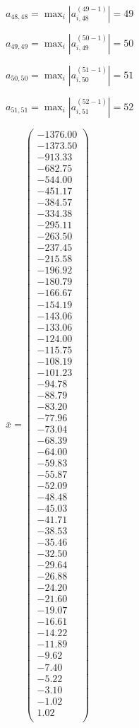 \documentclass[a4paper,12pt]{article}
\begin{document}
$a _{ 48, 48 } =  \max _i |a _{ i, 48 } ^{ (49 - 1) } | = 49$

$a _{ 49, 49 } =  \max _i |a _{ i, 49 } ^{ (50 - 1) } | = 50$

$a _{ 50, 50 } =  \max _i |a _{ i, 50 } ^{ (51 - 1) } | = 51$

$a _{ 51, 51 } =  \max _i |a _{ i, 51 } ^{ (52 - 1) } | = 52$

$\bar { x } = \begin{pmatrix}
-1376.00 \\
-1373.50 \\
-913.33 \\
-682.75 \\
-544.00 \\
-451.17 \\
-384.57 \\
-334.38 \\
-295.11 \\
-263.50 \\
-237.45 \\
-215.58 \\
-196.92 \\
-180.79 \\
-166.67 \\
-154.19 \\
-143.06 \\
-133.06 \\
-124.00 \\
-115.75 \\
-108.19 \\
-101.23 \\
-94.78 \\
-88.79 \\
-83.20 \\
-77.96 \\
-73.04 \\
-68.39 \\
-64.00 \\
-59.83 \\
-55.87 \\
-52.09 \\
-48.48 \\
-45.03 \\
-41.71 \\
-38.53 \\
-35.46 \\
-32.50 \\
-29.64 \\
-26.88 \\
-24.20 \\
-21.60 \\
-19.07 \\
-16.61 \\
-14.22 \\
-11.89 \\
-9.62 \\
-7.40 \\
-5.22 \\
-3.10 \\
-1.02 \\
1.02 \\
\end{pmatrix}
$
\end{document}
